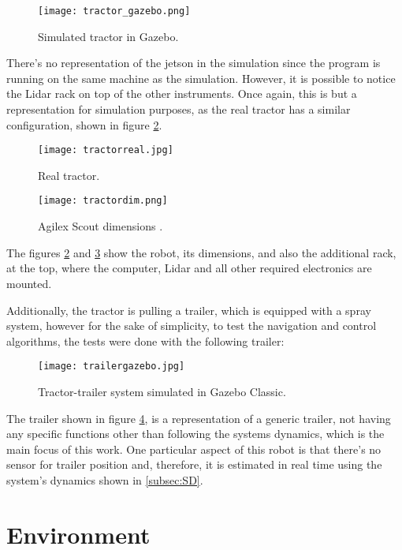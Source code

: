 \begin{figure}[h]
    \centering
    \texttt{[image: tractor\_gazebo.png]}
    \caption{Simulated tractor in Gazebo.}
    \label{fig:tractor_real}
\end{figure}

There's no representation of the jetson in the simulation since the program is running on 
the same machine as the simulation. However, it is possible to 
notice the Lidar rack on top of the other instruments. Once again, this is 
but a representation for simulation purposes, as the real tractor has a similar 
configuration, shown in figure \ref{fig:tractor}.
\begin{figure}[h]
    \centering
    \texttt{[image: tractorreal.jpg]}
    \caption{Real tractor.}
    \label{fig:tractor}
\end{figure}

 
\begin{figure}[h]
    \centering
    \texttt{[image: tractordim.png]}
    \caption{Agilex Scout dimensions \cite{scoutdim}.}
    \label{fig:tractordim}
\end{figure}

The figures \ref{fig:tractor} and \ref{fig:tractordim} show the robot, its dimensions, and also 
the additional rack, at the top, where the computer, Lidar and all other required electronics 
are mounted.

Additionally, the tractor is pulling a trailer, which is equipped with 
a spray system, however for the sake of simplicity, to test the navigation 
and control algorithms, the tests were done with the following trailer:
\clearpage
\begin{figure}[h]
    \centering
    \texttt{[image: trailergazebo.jpg]}
    \caption{Tractor-trailer system simulated in Gazebo Classic.}
    \label{fig:trailergazebo}
\end{figure}

The trailer shown in figure \ref{fig:trailergazebo}, is a representation of a generic trailer, not having any specific 
functions other than following the systems dynamics, which is the main focus of this work. 
One particular aspect of this robot is that there's no sensor for 
trailer position and, therefore, it is estimated in real time using the 
system's dynamics shown in \ref{subsec:SD}.



\section{Environment}
\label{subsec:environment}
